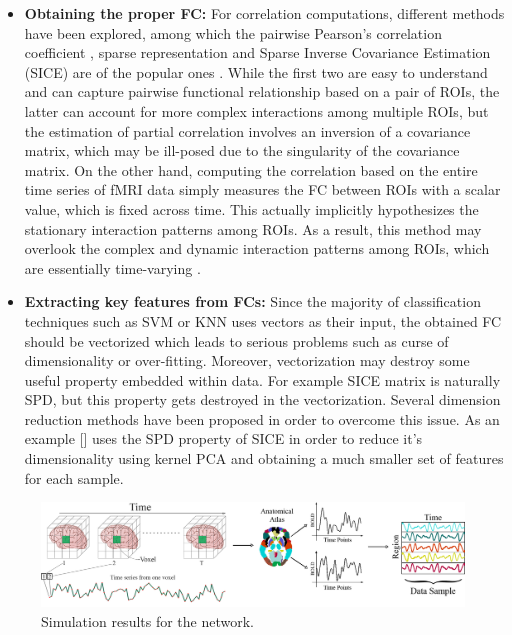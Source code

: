 \documentclass[journal]{IEEEtran}
\begin{document}
\begin{itemize}
	\item \textbf{Obtaining the proper FC:}
	For correlation computations, different methods have been explored, among which the pairwise Pearson’s correlation coefficient \cite{r10, r11}, sparse representation \cite{r10, r12, r13}  and Sparse Inverse Covariance Estimation (SICE) are of the popular ones \cite{r14, r15}. While the first two are easy to understand and can capture pairwise functional relationship based on a pair of ROIs, the latter can account for more complex interactions among multiple ROIs, but the estimation of partial correlation involves an inversion of a covariance matrix, which may be ill-posed due to the singularity of the covariance matrix. On the other hand, computing the correlation based on the entire time series of fMRI data simply measures the FC between ROIs with a scalar value, which is fixed across time. This actually implicitly hypothesizes the stationary interaction patterns among ROIs. As a result, this method may overlook the complex and dynamic interaction patterns among ROIs, which are essentially time-varying \cite{r16}\textendash \cite{r19}.
	
	\item \textbf{Extracting key features from FCs:}
	Since the majority of classification techniques such as SVM or KNN uses vectors as their input, the obtained FC should be vectorized which leads to serious problems such as curse of dimensionality or over-fitting. Moreover, vectorization may destroy some useful property embedded within data. For example SICE matrix is naturally SPD, but this property gets destroyed in the vectorization. Several dimension reduction methods have been proposed in order to overcome this issue. As an example [] uses the SPD property of SICE in order to reduce it's dimensionality using kernel PCA and obtaining a much smaller set of features for each sample. 
\end{itemize}

	
	\begin{figure}[!t]
		\centering
		\includegraphics[width=6in]{Data}
		
		\caption{Simulation results for the network.}
		\label{g1.1}
	\end{figure}
\end{document}
